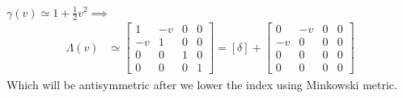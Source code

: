 \documentclass{article}
\newcommand{\onehalf}{\frac{1}{2}}
\begin{document}
$\gamma(v) \simeq 1 + \onehalf v^2 \implies $
\begin{equation}
    \begin{split}
        \Lambda(v) & \simeq \begin{bmatrix}
             1 & - v & 0 & 0\\
                -v & 1 & 0 & 0 \\
                0 & 0 & 1 & 0 \\
                0 & 0 & 0 & 1
                        \end{bmatrix} = [\delta] + \begin{bmatrix}
                            0 & - v & 0 & 0\\
                               -v & 0 & 0 & 0 \\
                               0 & 0 & 0 & 0 \\
                               0 & 0 & 0 & 0
                                       \end{bmatrix}
    \end{split}
\end{equation}
Which will be antisymmetric after we lower the index using Minkowski metric.
\end{document}
